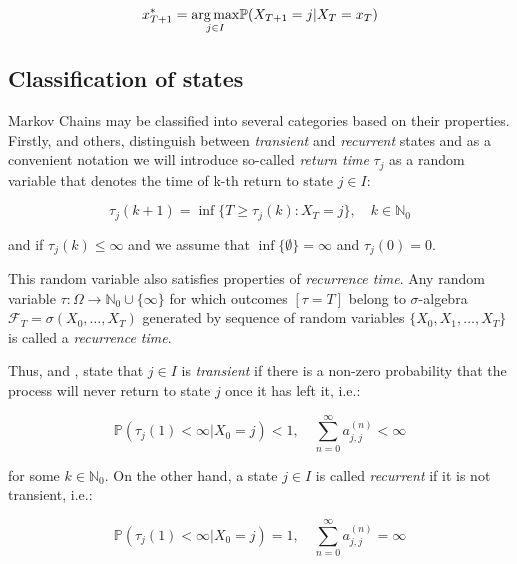 \begin{equation}
 x_{T+1}^* = \underset{j \in I}{\arg\max} \mathbb{P}(X_{T+1}=j|X_{T}=x_T) \\
\end{equation} 

\subsection{Classification of states}

Markov Chains may be classified into several categories based on their properties. 
Firstly, \citep{Praskova2012} and others, distinguish between \textit{transient} and \textit{recurrent} states and as a convenient notation we will introduce so-called \textit{return time} $\tau_j$ 
as a random variable that denotes the time of k-th return to state $j \in I$:

\begin{equation}
\tau_j(k+1) = \inf \{T \geq \tau_j(k) : X_T =j\}, \quad k \in \mathbb{N}_0
\end{equation}

\noindent and if $\tau_j(k) \leq \infty$ and we assume that $\inf\{\emptyset\} = \infty$ and $\tau_j(0) = 0$.

This random variable also satisfies properties of \textit{recurrence time}. 
Any random variable $\tau:\Omega \to \mathbb{N}_0 \cup \{ \infty \}$ for which outcomes $[\tau = T]$ belong to 
$\sigma$-algebra $\mathcal{F}_T = \sigma(X_0,\ldots,X_T)$ generated by sequence of random variables $\{X_0,X_1, \ldots , X_T\}$ is called a \textit{recurrence time}.

Thus, \citep{Bremaud1999} and \citep{Tolver2016}, state that $j \in I$ is \textit{transient} if there is a non-zero probability that the process will never return to state $j$ once it has left it, i.e.:

\begin{equation}
    \mathbb{P}(\tau_j(1) < \infty|X_0=j) < 1, \quad \sum\limits_{n=0}^{\infty} a_{j,j}^{(n)} < \infty
\end{equation}

for some $k \in \mathbb{N}_0$. On the other hand, a state $j \in I$ is called \textit{recurrent} if it is not transient, i.e.:

\begin{equation}
    \mathbb{P}(\tau_j(1) < \infty|X_0=j) = 1, \quad \sum\limits_{n=0}^{\infty} a_{j,j}^{(n)} = \infty
\end{equation}


